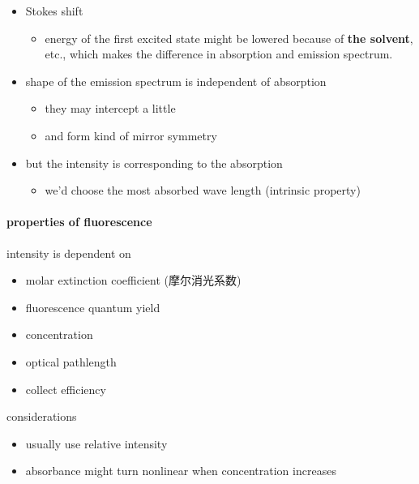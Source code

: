 \documentclass[]{article}
\let\oldparagraph\paragraph
\renewcommand{\paragraph}[1]{\oldparagraph{#1}\mbox{}}
\begin{document}
\begin{itemize}
\begin{itemize}
    \begin{itemize}
    \item
      Stokes shift

      \begin{itemize}
      \item
        energy of the first excited state might be lowered because of
        \textbf{the solvent}, etc., which makes the difference in
        absorption and emission spectrum.
      \end{itemize}
    \item
      shape of the emission spectrum is independent of absorption

      \begin{itemize}
      \item
        they may intercept a little
      \item
        and form kind of mirror symmetry
      \end{itemize}
    \item
      but the intensity is corresponding to the absorption

      \begin{itemize}
      \item
        we'd choose the most absorbed wave length (intrinsic property)
      \end{itemize}
    \end{itemize}
  \end{itemize}
\end{itemize}

\hypertarget{properties-of-fluorescence}{%
\paragraph{properties of
fluorescence}\label{properties-of-fluorescence}}

intensity is dependent on

\begin{itemize}
\item
  molar extinction coefficient (摩尔消光系数)
\item
  fluorescence quantum yield
\item
  concentration
\item
  optical pathlength
\item
  collect efficiency
\end{itemize}

considerations

\begin{itemize}
\item
  usually use relative intensity
\item
  absorbance might turn nonlinear when concentration increases
\end{itemize}
\end{document}

